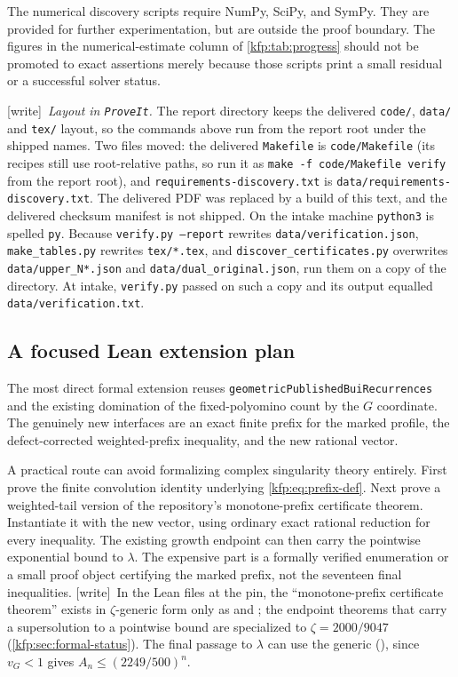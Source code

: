 \documentclass[11pt,a4paper]{article}
\theoremstyle{definition}
\theoremstyle{remark}
\newcommand{\repo}{\texttt{ProveIt}}
\newcommand{\wtag}{\textsf{\small[write]}}
\begin{document}
The numerical discovery scripts require NumPy, SciPy, and SymPy. They are
provided for further experimentation, but are outside the proof boundary.
The figures in the numerical-estimate column of \cref{kfp:tab:progress} should
not be promoted to exact assertions merely because those scripts print a
small residual or a successful solver status.

\wtag\ \emph{Layout in \repo.} The report directory keeps the delivered
\texttt{code/}, \texttt{data/} and \texttt{tex/} layout, so the commands above
run from the report root under the shipped names. Two files moved: the
delivered \texttt{Makefile} is \texttt{code/Makefile} (its recipes still use
root-relative paths, so run it as \texttt{make -f code/Makefile verify} from
the report root), and \texttt{requirements-discovery.txt} is
\texttt{data/requirements-discovery.txt}. The delivered PDF was replaced by a
build of this text, and the delivered checksum manifest is not shipped. On
the intake machine \texttt{python3} is spelled \texttt{py}. Because
\texttt{verify.py --report} rewrites \texttt{data/verification.json},
\texttt{make\_tables.py} rewrites \texttt{tex/*.tex}, and
\texttt{discover\_certificates.py} overwrites \texttt{data/upper\_N*.json} and
\texttt{data/dual\_original.json}, run them on a copy of the directory. At
intake, \texttt{verify.py} passed on such a copy and its output equalled
\texttt{data/verification.txt}.

\subsection{A focused Lean extension plan}
The most direct formal extension reuses
\texttt{geometricPublishedBuiRecurrences} and the existing domination of the
fixed-polyomino count by the $G$ coordinate. The genuinely new interfaces are
an exact finite prefix for the marked profile, the defect-corrected
weighted-prefix inequality, and the new rational vector.

A practical route can avoid formalizing complex singularity theory entirely.
First prove the finite convolution identity underlying
\eqref{kfp:eq:prefix-def}. Next prove a weighted-tail version of the repository's
monotone-prefix certificate theorem. Instantiate it with the new vector,
using ordinary exact rational reduction for every inequality. The existing
growth endpoint can then carry the pointwise exponential bound to $\lambda$.
The expensive part is a formally verified enumeration or a small proof object
certifying the marked prefix, not the seventeen final inequalities.
\wtag\ In the Lean files at the pin, the ``monotone-prefix certificate
theorem'' exists in $\zeta$-generic form only as
 and ;
the endpoint theorems that carry a supersolution to a pointwise bound are
specialized to $\zeta=2000/9047$ (\cref{kfp:sec:formal-status}). The final
passage to $\lambda$ can use the generic 
(), since $v_G<1$ gives $A_n\leq(2249/500)^n$.
\end{document}

